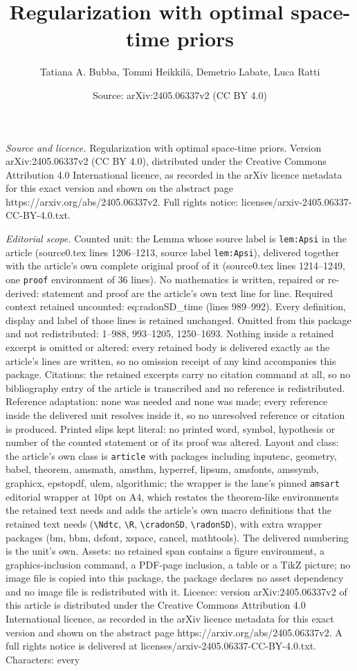 \documentclass[10pt,a4paper]{amsart}
\title[Regularization with optimal space-time priors]{Regularization with optimal space-time priors}
\author{Tatiana A. Bubba, Tommi Heikkil\"a, Demetrio Labate, Luca Ratti}
\date{Source: arXiv:2405.06337v2 (CC BY 4.0)}
\begin{document}
\maketitle

\noindent\emph{Source and licence.} Regularization with optimal space-time priors. Version arXiv:2405.06337v2 (CC BY 4.0), distributed under the Creative Commons Attribution 4.0 International licence, as recorded in the arXiv licence metadata for this exact version and shown on the abstract page https://arxiv.org/abs/2405.06337v2. Full rights notice: licenses/arxiv-2405.06337-CC-BY-4.0.txt.\par\smallskip

\noindent\textit{Editorial scope.} Counted unit: the Lemma whose source label is \texttt{lem:Apsi} in the article (source0.tex lines 1206--1213, source label \texttt{lem:Apsi}), delivered together with the article's own complete original proof of it (source0.tex lines 1214--1249, one \texttt{proof} environment of 36 lines). No mathematics is written, repaired or re-derived: statement and proof are the article's own text line for line. Required context retained uncounted: eq:radonSD\_time (lines 989--992). Every definition, display and label of those lines is retained unchanged. Omitted from this package and not redistributed: 1--988, 993--1205, 1250--1693. Nothing inside a retained excerpt is omitted or altered: every retained body is delivered exactly as the article's lines are written, so no omission receipt of any kind accompanies this package. Citations: the retained excerpts carry no citation command at all, so no bibliography entry of the article is transcribed and no reference is redistributed. Reference adaptation: none was needed and none was made; every reference inside the delivered unit resolves inside it, so no unresolved reference or citation is produced. Printed slips kept literal: no printed word, symbol, hypothesis or number of the counted statement or of its proof was altered. Layout and class: the article's own class is \texttt{article} with packages including inputenc, geometry, babel, theorem, amsmath, amsthm, hyperref, lipsum, amsfonts, amssymb, graphicx, epstopdf, ulem, algorithmic; the wrapper is the lane's pinned \texttt{amsart} editorial wrapper at 10pt on A4, which restates the theorem-like environments the retained text needs and adds the article's own macro definitions that the retained text needs (\texttt{\textbackslash Ndtc}, \texttt{\textbackslash R}, \texttt{\textbackslash cradonSD}, \texttt{\textbackslash radonSD}), with extra wrapper packages (bm, bbm, dsfont, xspace, cancel, mathtools). The delivered numbering is the unit's own. Assets: no retained span contains a figure environment, a graphics-inclusion command, a PDF-page inclusion, a table or a TikZ picture; no image file is copied into this package, the package declares no asset dependency and no image file is redistributed with it. Licence: version arXiv:2405.06337v2 of this article is distributed under the Creative Commons Attribution 4.0 International licence, as recorded in the arXiv licence metadata for this exact version and shown on the abstract page https://arxiv.org/abs/2405.06337v2. A full rights notice is delivered at licenses/arxiv-2405.06337-CC-BY-4.0.txt. Characters: every 
\end{document}
